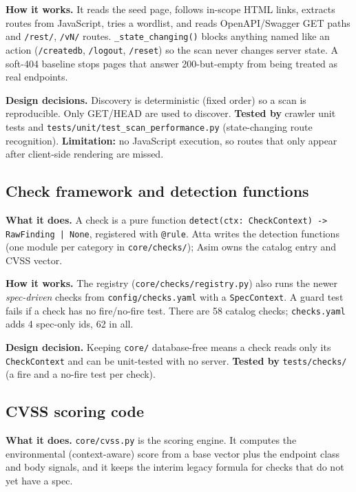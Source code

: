 \textbf{How it works.} It reads the seed page, follows in-scope HTML links,
extracts routes from JavaScript, tries a wordlist, and reads OpenAPI/Swagger GET
paths and \texttt{/rest/}, \texttt{/vN/} routes. \texttt{\_state\_changing()}
blocks anything named like an action (\texttt{/createdb}, \texttt{/logout},
\texttt{/reset}) so the scan never changes server state. A soft-404 baseline
stops pages that answer 200-but-empty from being treated as real endpoints.

\textbf{Design decisions.} Discovery is deterministic (fixed order) so a scan is
reproducible. Only GET/HEAD are used to discover. \textbf{Tested by} crawler
unit tests and \texttt{tests/unit/test\_scan\_performance.py} (state-changing
route recognition). \textbf{Limitation:} no JavaScript execution, so routes that
only appear after client-side rendering are missed.

\subsection{Check framework and detection functions}
\textbf{What it does.} A check is a pure function
\texttt{detect(ctx: CheckContext) -> RawFinding | None}, registered with
\texttt{@rule}. Atta writes the detection functions (one module per category in
\texttt{core/checks/}); Asim owns the catalog entry and CVSS vector.

\textbf{How it works.} The registry (\texttt{core/checks/registry.py}) also runs
the newer \emph{spec-driven} checks from \texttt{config/checks.yaml} with a
\texttt{SpecContext}. A guard test fails if a check has no fire/no-fire test.
There are 58 catalog checks; \texttt{checks.yaml} adds 4 spec-only ids, 62 in
all.

\textbf{Design decision.} Keeping \texttt{core/} database-free means a check reads
only its \texttt{CheckContext} and can be unit-tested with no server.
\textbf{Tested by} \texttt{tests/checks/} (a fire and a no-fire test per check).

\subsection{CVSS scoring code}
\textbf{What it does.} \texttt{core/cvss.py} is the scoring engine. It computes
the environmental (context-aware) score from a base vector plus the endpoint
class and body signals, and it keeps the interim legacy formula for checks that
do not yet have a spec.

